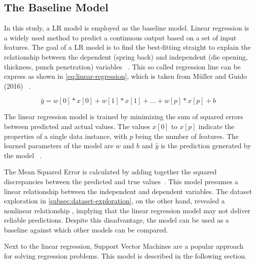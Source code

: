 
\subsection{The Baseline Model}\label{subsec:regression-models}
In this study, a \ac{LR} model is employed as the baseline model.
Linear regression is a widely used method to predict a continuous output  based on a set
of input features.
The goal of a \ac{LR} model is to find the best-fitting straight to explain the relationship between the dependent
(spring back) and independent (die opening, thickness, punch penetration)
variables
~\cite[pp. 45--46]{muller2016introduction}.
This so called regression line can be express as shown in \cref{eq:linear-regression}, which is taken from
Müller and Guido (2016)
~\cite[p. 45]{muller2016introduction}.

\begin{tcolorbox}[arc=0pt,boxrule=0.5pt]
    \begin{equation}
        \hat{y} = w[0] * x[0] + w[1] * x[1] + ... + w[p] * x[p] + b
        \label{eq:linear-regression}
    \end{equation}
\end{tcolorbox}

The linear regression model is trained by minimizing the sum of squared errors between predicted and actual values.
The values $x[0]$ to $x[p]$ indicate the properties of a single data instance, with $p$ being the number of
features.
The learned parameters of the model are $w$ and $b$ and $\hat{y}$  is the prediction generated by the model
~\cite[p. 45]{muller2016introduction}.

The Mean Squared Error is calculated by adding together the squared discrepancies between the predicted and true
values~\cite[pp. 47--68]{muller2016introduction}.
This model presumes a linear relationship between the independent and dependent variables.
The dataset exploration in \cref{subsec:dataset-exploration}, on the other hand, revealed a nonlinear relationship
, implying that the linear regression model may not deliver reliable predictions.
Despite this disadvantage, the model can be used as a baseline against which other models can be compared.

Next to the linear regression, Support Vector Machines are a popular approach for solving regression problems.
This model is described in the following section.


